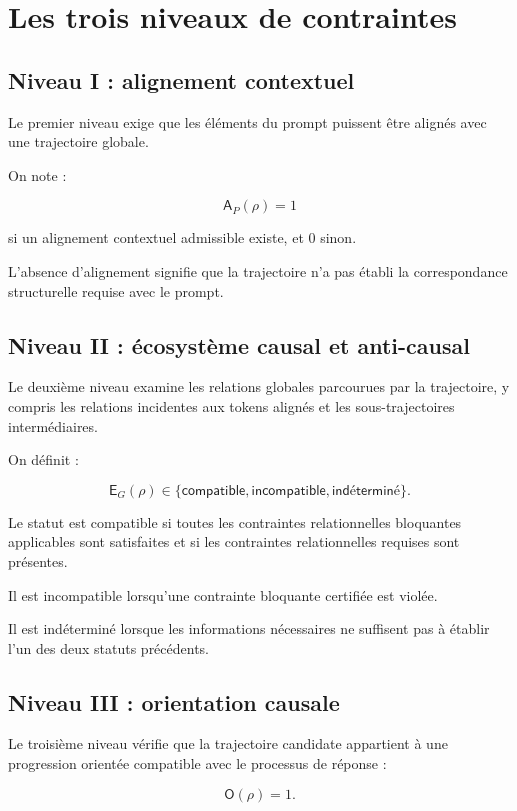 \documentclass[11pt,a4paper,oneside]{book}
\theoremstyle{remark}
\begin{document}
\section{Les trois niveaux de contraintes}

\subsection{Niveau I : alignement contextuel}

Le premier niveau exige que les éléments du prompt puissent être
alignés avec une trajectoire globale.

On note :

\[
\mathsf{A}_P(\rho)=1
\]

si un alignement contextuel admissible existe, et \(0\) sinon.

L'absence d'alignement signifie que la trajectoire n'a pas établi
la correspondance structurelle requise avec le prompt.

\subsection{Niveau II : écosystème causal et anti-causal}

Le deuxième niveau examine les relations globales parcourues par
la trajectoire, y compris les relations incidentes aux tokens
alignés et les sous-trajectoires intermédiaires.

On définit :

\[
\mathsf{E}_G(\rho)\in
\{\mathsf{compatible},
\mathsf{incompatible},
\mathsf{indéterminé}\}.
\]

Le statut est compatible si toutes les contraintes relationnelles
bloquantes applicables sont satisfaites et si les contraintes
relationnelles requises sont présentes.

Il est incompatible lorsqu'une contrainte bloquante certifiée est
violée.

Il est indéterminé lorsque les informations nécessaires ne suffisent
pas à établir l'un des deux statuts précédents.

\subsection{Niveau III : orientation causale}

Le troisième niveau vérifie que la trajectoire candidate appartient
à une progression orientée compatible avec le processus de réponse :

\[
\mathsf{O}(\rho)=1.
\]
\end{document}
